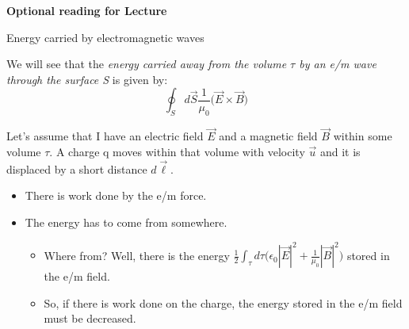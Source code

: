 
\begin{frame}[plain,c]
\begin{center}
{\Huge \bf Optional reading for Lecture \thislecture}
\end{center}
\end{frame}

%
%
%
%

\begin{frame}{Energy carried by electromagnetic waves}

We will see that the  {\em energy carried away from the volume $\tau$ by an e/m wave
through the surface S} is given by:
\begin{equation*}
     \oint_{S} d\vec{S} \frac{1}{\mu_0} \Big( \vec{E} \times \vec{B} \Big)
\end{equation*}

\vspace{0.3cm}

Let's assume that I have an electric field $\vec{E}$ and a magnetic field $\vec{B}$ within some volume $\tau$.
A charge q moves within that volume with velocity $\vec{u}$ and it is displaced by a short distance $d\vec{\ell}$.
\begin{itemize}
   \item There is work done by the e/m force.
   \item The energy has to come from somewhere.
       \begin{itemize}
            \item Where from? Well, there is the energy
                      $\displaystyle \frac{1}{2} \int_{\tau} d\tau \Big( \epsilon_0 |\vec{E}|^2 + \frac{1}{\mu_0} |\vec{B}|^2 \Big)$
                      stored in the e/m field.
             \item So, if there is work done on the charge, the energy stored in the e/m field must be decreased.
       \end{itemize}
\end{itemize}

\end{frame}

%
%
%
%

